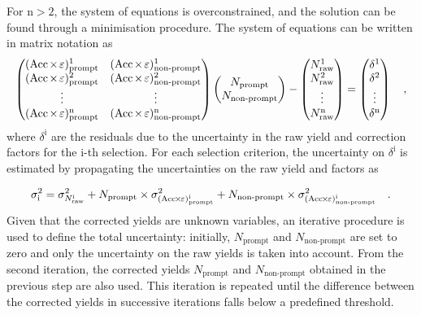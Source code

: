 For $\mathrm{n>2}$, the system of equations is overconstrained, and the solution can be found through a minimisation procedure. The system of equations can be written in matrix notation as
\begin{equation*}
    \begin{pmatrix}
        (\mathrm{Acc}\mkern-2mu\times\mkern-2mu\varepsilon)_\mathrm{prompt}^1 & (\mathrm{Acc}\mkern-2mu\times\mkern-2mu\varepsilon)_\mathrm{non\text{-}prompt}^1\\
        (\mathrm{Acc}\mkern-2mu\times\mkern-2mu\varepsilon)_\mathrm{prompt}^2 & (\mathrm{Acc}\mkern-2mu\times\mkern-2mu\varepsilon)_\mathrm{non\text{-}prompt}^2\\
        \vdots & \vdots\\
        (\mathrm{Acc}\mkern-2mu\times\mkern-2mu\varepsilon)_\mathrm{prompt}^\mathrm{n} & (\mathrm{Acc}\mkern-2mu\times\mkern-2mu\varepsilon)_\mathrm{non\text{-}prompt}^\mathrm{n}
    \end{pmatrix}
    \begin{pmatrix}
        N_\mathrm{prompt}\\
        N_\mathrm{non\text{-}prompt}
    \end{pmatrix}
    -
    \begin{pmatrix}
        N_\mathrm{raw}^1\\
        N_\mathrm{raw}^2\\
        \vdots\\
        N_\mathrm{raw}^\mathrm{n}
    \end{pmatrix}
    =
    \begin{pmatrix}
        \delta^1\\
        \delta^2\\
        \vdots\\
        \delta^\mathrm{n}
    \end{pmatrix}
    \quad ,
\end{equation*}
where $\delta^\mathrm{i}$ are the residuals due to the uncertainty in the raw yield and \aeff correction factors for the i-th selection. For each selection criterion, the uncertainty on $\delta^\mathrm{i}$ is estimated by propagating the uncertainties on the raw yield and \aeff factors as

\begin{equation*}
    \sigma_\mathrm{i}^2 = \sigma_{N_\mathrm{raw}^\mathrm{i}}^2 + N_\mathrm{prompt}\times\sigma^2_{(\mathrm{Acc}\mkern-2mu\times\mkern-2mu\varepsilon)_\mathrm{prompt}^\mathrm{i}} + N_\mathrm{non\text{-}prompt}\times\sigma^2_{(\mathrm{Acc}\mkern-2mu\times\mkern-2mu\varepsilon)_\mathrm{non\text{-}prompt}^\mathrm{i}}\quad .
\end{equation*}
Given that the corrected yields are unknown variables, an iterative procedure is used to define the total uncertainty: initially, 
$N_{\mathrm{prompt}}$ and $N_{\mathrm{non\text{-}prompt}}$ are set to zero and only the uncertainty on the raw yields is taken into account. From the second iteration, the corrected yields $N_{\mathrm{prompt}}$ and $N_{\mathrm{non\text{-}prompt}}$ obtained in the previous step are also used. This iteration is repeated until the difference between the corrected yields in successive iterations falls below a predefined threshold.

